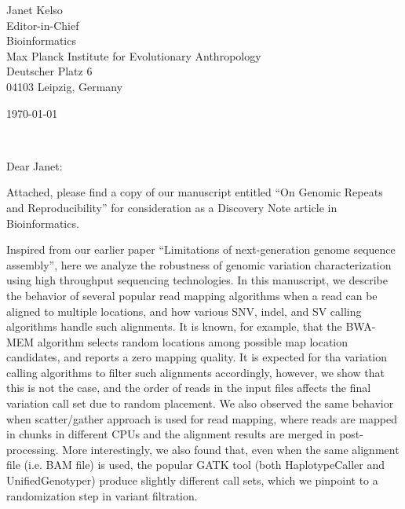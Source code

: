 \documentclass[10pt]{article}
\begin{document}
\thispagestyle{empty}

\vspace*{0.7cm}

\begin{minipage}{0.49\textwidth}
\begin{flushleft}
  \noindent 
Janet Kelso\\
Editor-in-Chief\\
Bioinformatics\\
Max Planck Institute for Evolutionary Anthropology\\
Deutscher Platz 6 \\
04103 Leipzig, Germany
\end{flushleft}
\end{minipage}
\begin{minipage}{0.47\textwidth}
\begin{flushright}
\today
\end{flushright}
\end{minipage} \\

\vspace*{0.7cm}  

Dear Janet:

Attached, please find a copy of our manuscript entitled ``On Genomic Repeats and Reproducibility''
for consideration as a Discovery Note article in Bioinformatics.

Inspired from our earlier paper ``Limitations of next-generation genome sequence assembly'', 
here we analyze the robustness of genomic variation characterization 
using high throughput sequencing technologies.
In this manuscript, we describe the behavior of several popular read mapping algorithms when a read can be aligned to multiple locations, and how various SNV, indel, and SV calling algorithms 
handle such alignments. It is known, for example, that the BWA-MEM algorithm selects random locations among possible map location candidates, and reports a zero mapping quality. It is expected
for tha variation calling algorithms to filter such alignments accordingly, however, we show that this is not the case, and the order of reads in the input files affects the 
final variation call set due to random placement. We also observed the same behavior when scatter/gather approach is used for read mapping, where reads are mapped in chunks in different CPUs and the alignment results are merged in post-processing. More interestingly, we also found that, even when the same alignment file (i.e. BAM file) is used, the popular GATK tool (both HaplotypeCaller and UnifiedGenotyper) produce slightly different call sets, which we pinpoint to a randomization step in variant filtration.
\end{document}
